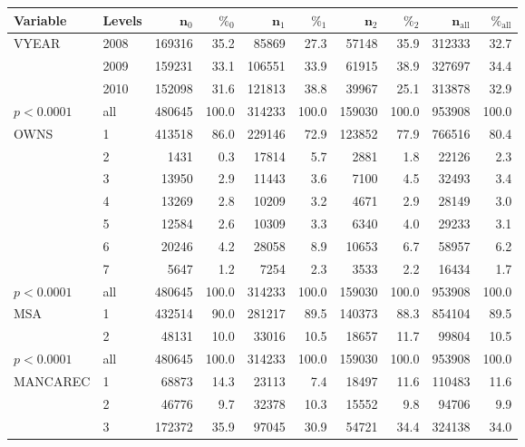 \begin{table}[ht]
\centering
{\footnotesize
\begin{tabular}{ll|rr|rr|rr|rr}
 \textbf{Variable} & \textbf{Levels} & $\mathbf{n_{\mathrm{0}}}$ & $\mathbf{\%_{\mathrm{0}}}$ & $\mathbf{n_{\mathrm{1}}}$ & $\mathbf{\%_{\mathrm{1}}}$ & $\mathbf{n_{\mathrm{2}}}$ & $\mathbf{\%_{\mathrm{2}}}$ & $\mathbf{n_{\mathrm{all}}}$ & $\mathbf{\%_{\mathrm{all}}}$ \\ 
  \hline
VYEAR & 2008 & 169316 & 35.2 & 85869 & 27.3 & 57148 & 35.9 & 312333 & 32.7 \\ 
   & 2009 & 159231 & 33.1 & 106551 & 33.9 & 61915 & 38.9 & 327697 & 34.4 \\ 
   & 2010 & 152098 & 31.6 & 121813 & 38.8 & 39967 & 25.1 & 313878 & 32.9 \\ 
   \hline
$p< 0.0001$ & all & 480645 & 100.0 & 314233 & 100.0 & 159030 & 100.0 & 953908 & 100.0 \\ 
   \hline
\hline
OWNS & 1 & 413518 & 86.0 & 229146 & 72.9 & 123852 & 77.9 & 766516 & 80.4 \\ 
   & 2 & 1431 & 0.3 & 17814 & 5.7 & 2881 & 1.8 & 22126 & 2.3 \\ 
   & 3 & 13950 & 2.9 & 11443 & 3.6 & 7100 & 4.5 & 32493 & 3.4 \\ 
   & 4 & 13269 & 2.8 & 10209 & 3.2 & 4671 & 2.9 & 28149 & 3.0 \\ 
   & 5 & 12584 & 2.6 & 10309 & 3.3 & 6340 & 4.0 & 29233 & 3.1 \\ 
   & 6 & 20246 & 4.2 & 28058 & 8.9 & 10653 & 6.7 & 58957 & 6.2 \\ 
   & 7 & 5647 & 1.2 & 7254 & 2.3 & 3533 & 2.2 & 16434 & 1.7 \\ 
   \hline
$p< 0.0001$ & all & 480645 & 100.0 & 314233 & 100.0 & 159030 & 100.0 & 953908 & 100.0 \\ 
   \hline
\hline
MSA & 1 & 432514 & 90.0 & 281217 & 89.5 & 140373 & 88.3 & 854104 & 89.5 \\ 
   & 2 & 48131 & 10.0 & 33016 & 10.5 & 18657 & 11.7 & 99804 & 10.5 \\ 
   \hline
$p< 0.0001$ & all & 480645 & 100.0 & 314233 & 100.0 & 159030 & 100.0 & 953908 & 100.0 \\ 
   \hline
\hline
MANCAREC & 1 & 68873 & 14.3 & 23113 & 7.4 & 18497 & 11.6 & 110483 & 11.6 \\ 
   & 2 & 46776 & 9.7 & 32378 & 10.3 & 15552 & 9.8 & 94706 & 9.9 \\ 
   & 3 & 172372 & 35.9 & 97045 & 30.9 & 54721 & 34.4 & 324138 & 34.0 \\ 

\end{tabular}}
\end{table}
